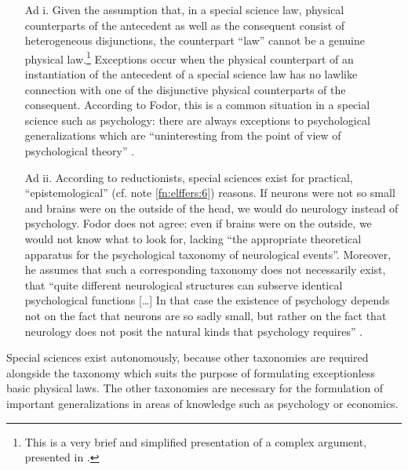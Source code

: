 \documentclass[output=paper]{langscibook}
\begin{document}
\begin{enumerate}
    \item[Ad i.] Given the assumption that, in a special science law, physical counterparts of the antecedent as well as the consequent consist of heterogeneous disjunctions, the counterpart ``law'' cannot be a genuine physical law.\footnote{This is a very brief and simplified presentation of a complex argument, presented in \citet[109]{Fodor1974}.} Exceptions occur when the physical counterpart of an instantiation of the antecedent of a special science law has no lawlike connection with one of the disjunctive physical counterparts of the consequent. According to Fodor, this is a common situation in a special science such as psychology: there are always exceptions to psychological generalizations which are  ``uninteresting from the point of view of psychological theory'' \citep[111]{Fodor1974}.

    \item[Ad ii.] According to reductionists, special sciences exist for practical, ``epistemological'' (cf. note \ref{fn:elffers:6}) reasons. If neurons were not so small and brains were on the outside of the head, we would do neurology instead of psychology. Fodor does not agree: even if brains were on the outside, we would not know what to look for, lacking ``the appropriate theoretical apparatus for the psychological taxonomy of neurological events''. Moreover, he assumes that such a corresponding taxonomy does not necessarily exist, that ``quite different neurological structures can subserve identical psychological functions […] In that case the existence of psychology depends not on the fact that neurons are so sadly small, but rather on the fact that neurology does not posit the natural kinds that psychology requires'' \citep[113]{Fodor1974}.
\end{enumerate}

Special sciences exist autonomously, because other taxonomies are required alongside the taxonomy which suits the purpose of formulating exceptionless basic physical laws. The other taxonomies are necessary for the formulation of important generalizations in areas of knowledge such as psychology or economics.
\end{document}

